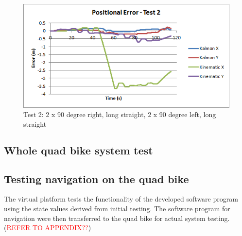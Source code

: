 \documentclass[main.tex]{subfiles}
\begin{document}
\begin{figure}[ht]
\includegraphics[width=\textwidth]{5-Testing/position_error_test_2.png}
\centering
\caption{Test 2: 2 x 90 degree right, long straight, 2 x 90 degree left, long straight} 
\end{figure}

\subsection{Whole quad bike system test}


\subsection{Testing navigation on the quad bike}
The virtual platform tests the functionality of the developed software program using the state values derived from initial testing. The software program for navigation were then transferred to the quad bike for actual system testing. (\textcolor{red}{REFER TO APPENDIX??})
\end{document}
